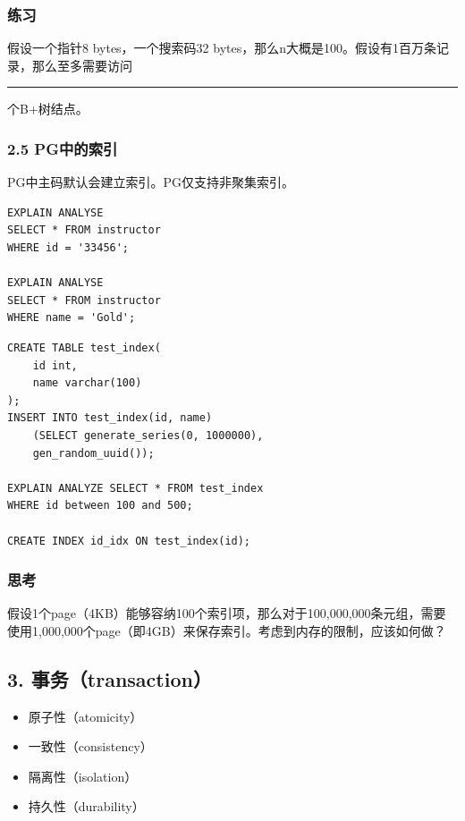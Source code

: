 \documentclass[aspectratio=169, 14pt]{beamer}
\begin{document}
\begin{frame}[fragile]
    \frametitle{练习}


假设一个指针8 bytes，一个搜索码32 bytes，那么n大概是100。假设有1百万条记录，那么至多需要访问\rule{1cm}{0.15mm}个B+树结点。

\end{frame}

\begin{frame}[fragile]
    \frametitle{2.5 PG中的索引}
PG中主码默认会建立索引。PG仅支持非聚集索引。
    
\begin{verbatim} 
EXPLAIN ANALYSE 
SELECT * FROM instructor
WHERE id = '33456';

EXPLAIN ANALYSE 
SELECT * FROM instructor
WHERE name = 'Gold';
\end{verbatim}
\end{frame}

\begin{frame}[fragile]
    \begin{verbatim} 
CREATE TABLE test_index(
    id int,
    name varchar(100)
);
INSERT INTO test_index(id, name)
    (SELECT generate_series(0, 1000000), 
    gen_random_uuid());

EXPLAIN ANALYZE SELECT * FROM test_index
WHERE id between 100 and 500;

CREATE INDEX id_idx ON test_index(id);
    \end{verbatim}
    

\end{frame}

\begin{frame}
    \frametitle{思考}
假设1个page（4KB）能够容纳100个索引项，那么对于100,000,000条元组，需要使用1,000,000个page（即4GB）来保存索引。考虑到内存的限制，应该如何做？
    

\end{frame}

\begin{frame}
    \section{\textcolor{darkmidnightblue}{3. 事务（transaction）}}
    \begin{itemize}
        \item 原子性（atomicity）
        \item 一致性（consistency）
        \item 隔离性（isolation）
        \item 持久性（durability）
    \end{itemize}

\end{frame}
\end{document}
